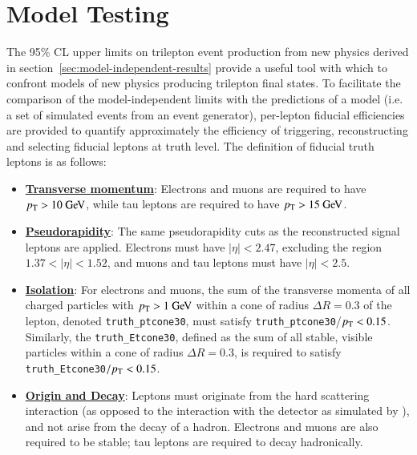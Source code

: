 \section{Model Testing}\label{sec:model-independent-model-testing}
The 95\% CL upper limits on trilepton event production from new physics derived in section~\ref{sec:model-independent-results} provide a useful tool with which to confront models of new physics producing trilepton final states. To facilitate the comparison of the model-independent limits with the predictions of a model (i.e. a set of simulated events from an event generator), per-lepton fiducial efficiencies are provided to quantify approximately the efficiency of triggering, reconstructing and selecting fiducial leptons at truth level. The definition of fiducial truth leptons is as follows: 

\begin{itemize}
	\item \underline{\textbf{Transverse momentum}}: Electrons and muons are required to have $\pt>10 \GeV$, while tau leptons are required to have $\pt>15 \GeV$.
	\item \underline{\textbf{Pseudorapidity}}: The same pseudorapidity cuts as the reconstructed signal leptons are applied. Electrons must have $|\eta|<2.47$, excluding the region $1.37<|\eta|<1.52$, and muons and tau leptons must have $|\eta|<2.5$.
	\item \underline{\textbf{Isolation}}: For electrons and muons, the sum of the transverse momenta of all charged particles with $\pt>1 \GeV$ within a cone of radius $\Delta R=0.3$ of the lepton, denoted \texttt{truth\_ptcone30}, must satisfy \texttt{truth\_ptcone30}/$p_{\text{T}}<0.15$. Similarly, the \texttt{truth\_Etcone30}, defined as the sum of all stable, visible particles within a cone of radius $\Delta R=0.3$, is required to satisfy \texttt{truth\_Etcone30}$/p_{\text{T}}<0.15$.
	\item \underline{\textbf{Origin and Decay}}: Leptons must originate from the hard scattering interaction (as opposed to the interaction with the detector as simulated by \geant), and not arise from the decay of a hadron. Electrons and muons are also required to be stable; tau leptons are required to decay hadronically. 
\end{itemize}


